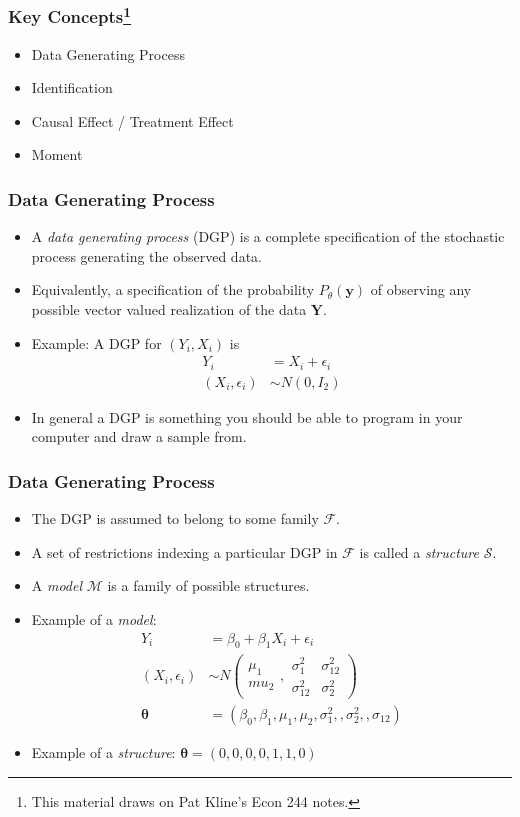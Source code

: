\documentclass[english,xcolor=svgnames]{beamer}
\begin{document}
\begin{frame}
\frametitle[alignment=center]{Key Concepts\footnote{This material draws on Pat Kline's Econ 244 notes.}}
\begin{itemize}
	\item Data Generating Process
	\item Identification
	\item Causal Effect / Treatment Effect
	\item Moment
\end{itemize}
\end{frame}

\begin{frame}
\frametitle[alignment=center]{Data Generating Process}
\begin{itemize}
	\item A \emph{data generating process} (DGP) is a complete specification of the stochastic process generating the observed data.
	\item Equivalently, a specification of the probability $P_{\theta}(\bm{y})$ of observing any possible vector valued realization of the data $\bm{Y}$.
	\item Example: A DGP for $(Y_i,X_i)$ is
	\begin{align*}
		Y_i &= X_i + \epsilon_i \\
		(X_i, \epsilon_i) &\sim N(0,I_2) 
	\end{align*}
	\item In general a DGP is something you should be able to program in your computer and draw a sample from.
\end{itemize}
\end{frame}

\begin{frame}
\frametitle[alignment=center]{Data Generating Process}
\begin{itemize}
	\item The DGP is assumed to belong to some family $\mathcal{F}$.
	\item A set of restrictions indexing a particular DGP in $\mathcal{F}$ is called a \emph{structure} $\mathcal{S}$.
	\item A \emph{model} $\mathcal{M}$ is a family of possible structures.
	\item Example of a \emph{model}:
	\begin{align*}
		Y_i &= \beta_0 + \beta_1 X_i + \epsilon_i \\
		(X_i, \epsilon_i) &\sim N\left(\begin{matrix} \mu_1 \\ mu_2 \end{matrix} ,\begin{matrix} \sigma_1^2 & \sigma_{12}^2 \\ \sigma_{12}^2 & \sigma_2^2 \end{matrix} \right) \\
		\bm{\theta} &= (\beta_0,\beta_1,\mu_1,\mu_2,\sigma_1^2,,\sigma_2^2, ,\sigma_{12})
	\end{align*}
	\item Example of a \emph{structure}: $\bm{\theta} = (0,0,0,0,1,1,0)$
\end{itemize}
\end{frame}
\end{document}

